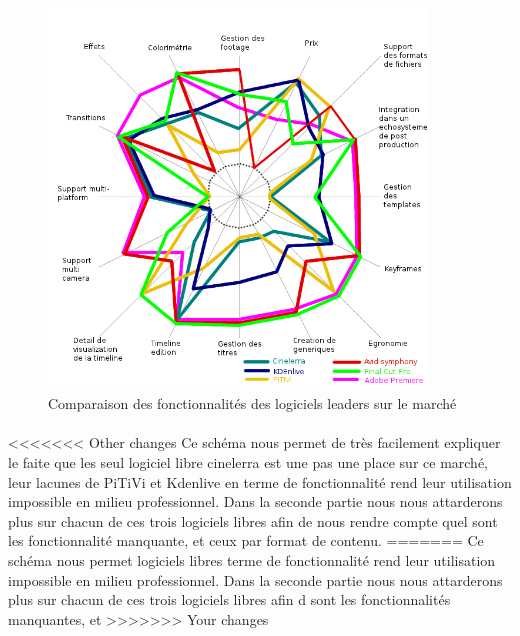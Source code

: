 \begin{itemize}
\begin{figure} [H]
\begin{center}
    \includegraphics[width=0.9\textwidth]{images/spiderDiagramFeaturesComparision}

  \end{center}

  \caption{Comparaison des fonctionnalités des logiciels leaders sur
  le marché}

  \label{Yes}

\end{figure}

\paragraph {}

<<<<<<< Other changes
Ce schéma nous permet de très facilement expliquer le faite que les
seul logiciel libre cinelerra est une pas une place sur ce marché,
leur lacunes de PiTiVi et Kdenlive en terme de fonctionnalité rend leur
utilisation impossible en milieu professionnel. Dans la seconde partie
nous nous attarderons plus sur chacun de ces trois logiciels libres
afin de nous rendre compte quel sont les fonctionnalité manquante,
et ceux par format de contenu.
=======
Ce schéma nous permet %
logiciels libres %
terme de fonctionnalité rend leur utilisation impossible en milieu
professionnel. Dans la seconde partie nous nous attarderons plus sur
chacun de ces trois logiciels libres afin d%
sont les fonctionnalités manquantes, et %
>>>>>>> Your changes



\end{itemize}
